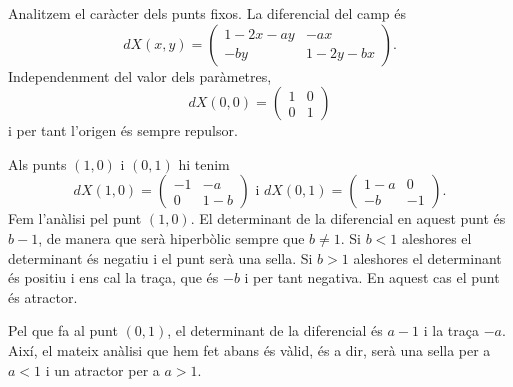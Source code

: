 \documentclass[12pt]{article}
\numberwithin{table}{section}
\numberwithin{equation}{section}
\numberwithin{figure}{section}
\begin{document}
Analitzem el caràcter dels punts fixos. La diferencial del camp és
\begin{equation} \label{eqn:diferencial}
	dX(x,y) = \begin{pmatrix}
		1 - 2x - ay & -ax \\
		-by & 1 - 2y -bx
	\end{pmatrix}.
\end{equation}
Independenment del valor dels paràmetres,
\begin{equation*}
	dX(0,0) = \begin{pmatrix}
		1 & 0 \\ 0 & 1
	\end{pmatrix}
\end{equation*}
i per tant l'origen és sempre repulsor. 

Als punts \( (1,0) \) i \( (0,1) \) hi tenim
\begin{equation*}
	dX(1,0) = \begin{pmatrix}
		-1 & -a \\
		0 & 1 - b
	\end{pmatrix} \text{ i } 
	dX(0,1) = \begin{pmatrix}
		1 - a & 0 \\
		-b & -1
	\end{pmatrix}.
\end{equation*}
Fem l'anàlisi pel punt \( (1,0) \). El determinant de la diferencial en aquest punt és \( b - 1 \), de manera que serà hiperbòlic sempre que \( b \neq 1 \). Si \( b < 1 \) aleshores el determinant és negatiu i el punt serà una sella. Si \( b > 1 \) aleshores el determinant és positiu i ens cal la traça, que és \( -b \) i per tant negativa. En aquest cas el punt és atractor.  

Pel que fa al punt \( (0,1) \), el determinant de la diferencial és \( a - 1 \) i la traça \( -a \). Així, el mateix anàlisi que hem fet abans és vàlid, és a dir, serà una sella per a \( a < 1 \) i un atractor per a \( a > 1 \). 
\end{document}

